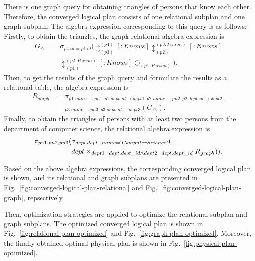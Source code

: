 \begin{example}
    There is one graph query for obtaining triangles of persons that know each other.
    Therefore, the converged logical plan consists of one relational subplan and one graph subplan.
    The algebra expression corresponding to this query is as follows:
    Firstly, to obtain the triangles, the graph relational algebra expression is
    \begin{equation*}
        \begin{split}
            G_{\triangle} = & \sigma_{p4.id = p1.id}(\updownarrow_{(p3)}^{(p4)}[:Knows]\updownarrow_{(p2)}^{(p3:Person)}[:Knows] \\
            & \updownarrow_{(p1)}^{(p2:Person)}[:Knows]\bigcirc_{(p1:Person)}).
        \end{split}
    \end{equation*}
    Then, to get the results of the graph query and formulate the results as a relational table, the algebra expression is 
    \begin{equation*}
        \begin{split}
            R_{graph} = & \pi_{p1.name\rightarrow pn1, p1.dept\_id \rightarrow dept1,p2.name\rightarrow pn2, p2.dept\_id \rightarrow dept2,} \\
            & _{p3.name\rightarrow pn3, p3.dept\_id \rightarrow dept3}(G_{\triangle}).
        \end{split}
    \end{equation*}
    Finally, to obtain the triangles of persons with at least two persons from the department of computer science, the relational algebra expression is
    \begin{equation*}
        \begin{split}
        \pi_{pn1, pn2, pn3}
        (& \sigma_{dept.dept\_name = `Computer Science'}( \\ 
        & dept \Join_{dept1=dept.dept\_id \land dept2=dept.dept\_id} R_{graph})).
        \end{split}
    \end{equation*}

    Based on the above algebra expressions, the corresponding converged logical plan is shown, and its relational and graph subplans are presented in Fig.~\ref{fig:converged-logical-plan-relational} and Fig.~\ref{fig:converged-logical-plan-graph}, repsectively.
    
    Then, optimization strategies are applied to optimize the relational subplan and graph subplans.
    The optimized converged logical plan is shown in Fig.~\ref{fig:relational-plan-optimized} and Fig.~\ref{fig:graph-plan-optimized}.
    Moreover, the finally obtained optimal physical plan is shown in Fig.~\ref{fig:physical-plan-optimized}.
\end{example}

